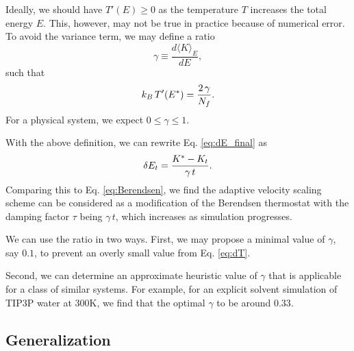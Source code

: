 \documentclass[reprint]{revtex4-1}
\begin{document}
Ideally, we should have $T'(E) \ge 0$
as the temperature $T$ increases the total energy $E$.
%
This, however, may not be true in practice
because of numerical error.
%
%
To avoid the variance term,
we may define a ratio
%
\begin{equation}
  \gamma
  \equiv
  \frac
  {
    d \langle K \rangle_E
  }
  {
    dE
  }
  ,
  \label{eq:gamma_def}
\end{equation}
%
such that
%
\begin{equation}
  k_B \, T'(E^*)
  =
  \frac{ 2 \, \gamma } { N_f }
  .
  \notag
\end{equation}
%
For a physical system, we expect $0 \le \gamma \le 1$.
%

With the above definition, we can rewrite Eq. \eqref{eq:dE_final} as
%
\begin{equation}
  \delta E_t
  =
  \frac{ K^* - K_t } { \gamma \, t }
  .
  \notag
\end{equation}
%
Comparing this to Eq. \eqref{eq:Berendsen},
we find the adaptive velocity scaling scheme
can be considered as a modification of the Berendsen thermostat
with the damping factor $\tau$ being $\gamma \, t$,
which increases as simulation progresses.


We can use the ratio in two ways.
%
First, we may propose a minimal value of $\gamma$, say $0.1$,
to prevent an overly small value from Eq. \eqref{eq:dT}.

Second,
we can determine an approximate heuristic value of $\gamma$
that is applicable for a class of similar systems.
%
For example,
for an explicit solvent simulation of TIP3P water\cite{jorgensen1983}
at 300K, we find that the optimal $\gamma$
to be around $0.33$.


\subsection{Generalization}
\end{document}
